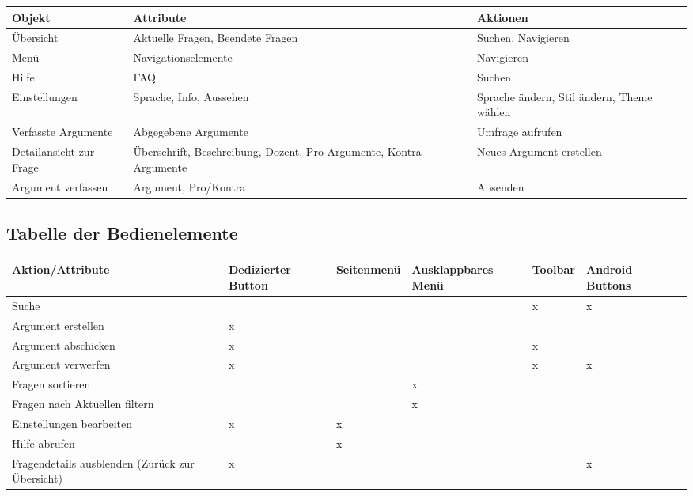 \begin{tabular}{l p{5cm} p{5cm}}
Objekt & Attribute & Aktionen \\
\hline
Übersicht & Aktuelle Fragen, Beendete Fragen & Suchen, Navigieren\\
Menü & Navigationselemente & Navigieren\\
Hilfe & FAQ & Suchen\\
Einstellungen & Sprache, Info, Aussehen & Sprache ändern, Stil ändern, Theme wählen\\
Verfasste Argumente & Abgegebene Argumente & Umfrage aufrufen\\
Detailansicht zur Frage & Überschrift, Beschreibung, Dozent, Pro-Argumente, Kontra-Argumente & Neues Argument erstellen\\
Argument verfassen &Argument, Pro/Kontra & Absenden\\
\end{tabular}

\subsection{Tabelle der Bedienelemente}
\label{sec:bedienelemente}

\bgroup
\def\arraystretch{1.5}
\begin{tabular}{p{4.5cm} | p{1.8cm} p{2cm} p{2.5cm} p{2cm} p{1.8cm} p{2cm}}
Aktion/Attribute & Dedizierter Button & Seitenmenü & Ausklappbares Menü & Toolbar & Android Buttons\\
\hline
Suche &  &  &  & x & x\\
Argument erstellen & x &  &  &  & \\
Argument abschicken & x &  &  & x & \\
Argument verwerfen & x &  &  & x & x\\
Fragen sortieren &  &  & x &  & \\
Fragen nach Aktuellen filtern &  &  & x &  & \\
Einstellungen bearbeiten & x & x &  &  & \\
Hilfe abrufen &  & x &  &  & \\
Fragendetails ausblenden (Zurück zur Übersicht) & x &  &  &  & x\\
\end{tabular}
\egroup

\clearpage